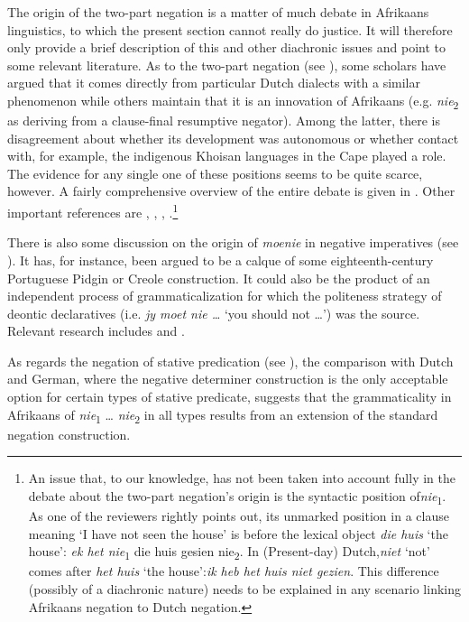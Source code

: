 \documentclass[output=paper,colorlinks,citecolor=brown]{langscibook}
\begin{document}
The origin of the two-part negation is a matter of much debate in Afrikaans linguistics, to which the present section cannot really do justice. It will therefore only provide a brief description of this and other diachronic issues and point to some relevant literature. As to the two-part negation (see ), some scholars have argued that it comes directly from particular Dutch dialects with a similar phenomenon while others maintain that it is an innovation of Afrikaans (e.g. \textit{nie}\textsubscript{2} as deriving from a clause-final resumptive negator). Among the latter, there is disagreement about whether its development was autonomous or whether contact with, for example, the indigenous Khoisan languages in the Cape played a role. The evidence for any single one of these positions seems to be quite scarce, however. A fairly comprehensive overview of the entire debate is given in \citet{Roberge2000}. Other important references are \citet{Besten1986}, \citet{Bell2001}, \citet{Deumert2017}, \citet{Rensburg2018}.\footnote{An issue that, to our knowledge, has not been taken into account fully in the debate about the two-part negation’s origin is the syntactic position of\textit{nie}\textsubscript{1}. As one of the reviewers rightly points out, its unmarked position in a clause meaning ‘I have not seen the house’ is before the lexical object \textit{die huis} ‘the house’: \textit{ek het nie}\textsubscript{1}\textrm{ die huis gesien nie}\textsubscript{2}. In (Present-day) Dutch,\textit{niet} ‘not’ comes after \textit{het huis} ‘the house’:\textit{ik heb het huis niet gezien}. This difference (possibly of a diachronic nature) needs to be explained in any scenario linking Afrikaans negation to Dutch negation.} 

There is also some discussion on the origin of \textit{moenie} in negative imperatives (see ). It has, for instance, been argued to be a calque of some eighteenth-century Portuguese Pidgin or Creole construction. It could also be the product of an independent process of grammaticalization for which the politeness strategy of deontic declaratives (i.e. \textit{jy moet nie …} ‘you should not …’) was the source. Relevant research includes \citet{Besten2004} and \citet{Olmen2010}. 

As regards the negation of stative predication (see ), the comparison with Dutch and German, where the negative determiner construction is the only acceptable option for certain types of stative predicate, suggests that the grammaticality in Afrikaans of \textit{nie}\textsubscript{1} … \textit{nie}\textsubscript{2} in all types results from an extension of the standard negation construction. 
\end{document}
